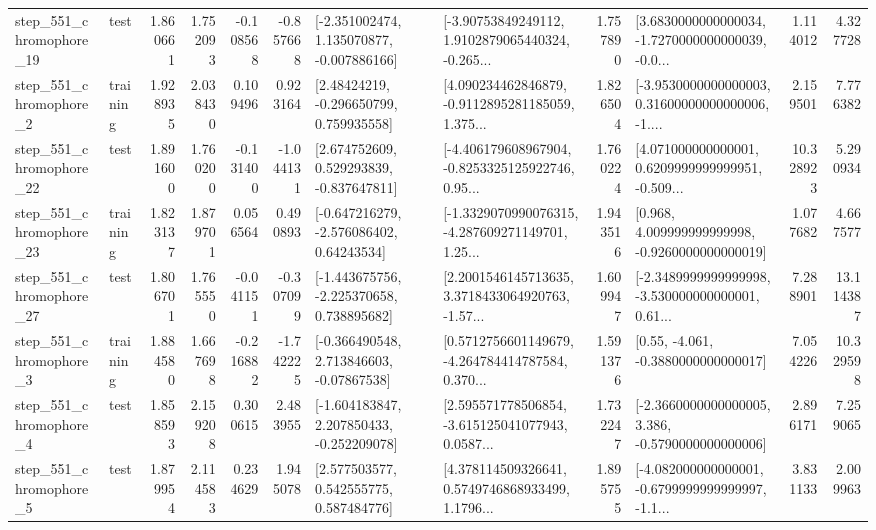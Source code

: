 \begin{tabular}{llrrrrllrlrr}
  step\_551\_chromophore\_19 &      test &      1.860661 &    1.752093 &     -0.108568 & -0.857668 &   [-2.351002474, 1.135070877, -0.007886166] &  [-3.90753849249112, 1.9102879065440324, -0.265... &       1.757890 &  [3.6830000000000034, -1.7270000000000039, -0.0... &            1.114012 &          4.327728 \\
   step\_551\_chromophore\_2 &  training &      1.928935 &    2.038430 &      0.109496 &  0.923164 &     [2.48424219, -0.296650799, 0.759935558] &  [4.090234462846879, -0.9112895281185059, 1.375... &       1.826504 &  [-3.9530000000000003, 0.31600000000000006, -1.... &            2.159501 &          7.776382 \\
  step\_551\_chromophore\_22 &      test &      1.891600 &    1.760200 &     -0.131400 & -1.044131 &    [2.674752609, 0.529293839, -0.837647811] &  [-4.406179608967904, -0.8253325125922746, 0.95... &       1.760224 &  [4.071000000000001, 0.6209999999999951, -0.509... &           10.328923 &          5.290934 \\
  step\_551\_chromophore\_23 &  training &      1.823137 &    1.879701 &      0.056564 &  0.490893 &    [-0.647216279, -2.576086402, 0.64243534] &  [-1.3329070990076315, -4.287609271149701, 1.25... &       1.943516 &    [0.968, 4.009999999999998, -0.9260000000000019] &            1.077682 &          4.667577 \\
  step\_551\_chromophore\_27 &      test &      1.806701 &    1.765550 &     -0.041151 & -0.307099 &   [-1.443675756, -2.225370658, 0.738895682] &  [2.2001546145713635, 3.3718433064920763, -1.57... &       1.609947 &  [-2.3489999999999998, -3.530000000000001, 0.61... &            7.288901 &         13.114387 \\
   step\_551\_chromophore\_3 &  training &      1.884580 &    1.667698 &     -0.216882 & -1.742225 &    [-0.366490548, 2.713846603, -0.07867538] &  [0.5712756601149679, -4.264784414787584, 0.370... &       1.591376 &                [0.55, -4.061, -0.3880000000000017] &            7.054226 &         10.329598 \\
   step\_551\_chromophore\_4 &      test &      1.858593 &    2.159208 &      0.300615 &  2.483955 &   [-1.604183847, 2.207850433, -0.252209078] &  [2.595571778506854, -3.615125041077943, 0.0587... &       1.732247 &  [-2.3660000000000005, 3.386, -0.5790000000000006] &            2.896171 &          7.259065 \\
   step\_551\_chromophore\_5 &      test &      1.879954 &    2.114583 &      0.234629 &  1.945078 &     [2.577503577, 0.542555775, 0.587484776] &  [4.378114509326641, 0.5749746868933499, 1.1796... &       1.895755 &  [-4.082000000000001, -0.6799999999999997, -1.1... &            3.831133 &          2.009963 \\

\end{tabular}
